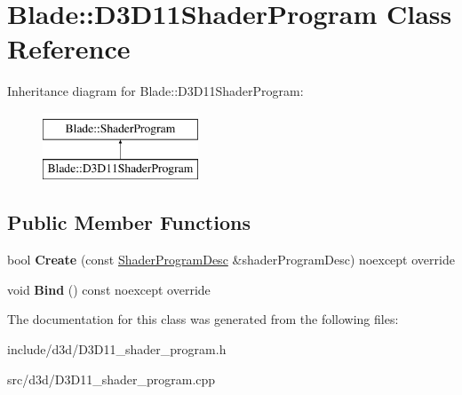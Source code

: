 \hypertarget{class_blade_1_1_d3_d11_shader_program}{}\section{Blade\+:\+:D3\+D11\+Shader\+Program Class Reference}
\label{class_blade_1_1_d3_d11_shader_program}
Inheritance diagram for Blade\+:\+:D3\+D11\+Shader\+Program\+:\begin{figure}[H]
\begin{center}
\leavevmode
\includegraphics[height=2.000000cm]{class_blade_1_1_d3_d11_shader_program}
\end{center}
\end{figure}
\subsection*{Public Member Functions}
\begin{DoxyCompactItemize}
\item 
\mbox{\label{class_blade_1_1_d3_d11_shader_program_a3c82d09016bc82d9b0f7b68b0b82506c}} 
bool {\bfseries Create} (const \hyperlink{struct_blade_1_1_shader_program_desc}{Shader\+Program\+Desc} \&shader\+Program\+Desc) noexcept override
\item 
\mbox{\label{class_blade_1_1_d3_d11_shader_program_ad647764c5ca36886a85d2537d0e7e61c}} 
void {\bfseries Bind} () const noexcept override
\end{DoxyCompactItemize}


The documentation for this class was generated from the following files\+:\begin{DoxyCompactItemize}
\item 
include/d3d/D3\+D11\+\_\+shader\+\_\+program.\+h\item 
src/d3d/D3\+D11\+\_\+shader\+\_\+program.\+cpp\end{DoxyCompactItemize}
